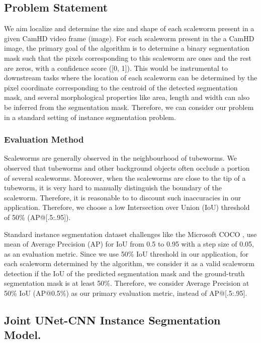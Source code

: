 \documentclass[10pt,twocolumn,letterpaper]{article}
\begin{document}
\subsection{Problem Statement}
We aim localize and determine the size and shape of each scaleworm present in a given CamHD video frame (image). For each scaleworm present in the a CamHD image, the primary goal of the algorithm is to determine a binary segmentation mask such that the pixels corresponding to this scaleworm are ones and the rest are zeros, with a confidence score ([0, 1]). This would be instrumental to downstream tasks where the location of each scaleworm can be determined by the pixel coordinate corresponding to the centroid of the detected segmentation mask, and several morphological properties like area, length and width can also be inferred from the segmentation mask. Therefore, we can consider our problem in a standard setting of instance segmentation problem.

\subsubsection{Evaluation Method}
Scaleworms are generally observed in the neighbourhood of tubeworms. We observed that tubeworms and other background objects often occlude a portion of several scaleworms. Moreover, when the scaleworms are close to the tip of a tubeworm, it is very hard to manually distinguish the boundary of the scaleworm. Therefore, it is reasonable to to discount such inaccuracies in our application. Therefore, we choose a low Intersection over Union (IoU) threshold of 50\% (AP@[.5:.95]).

Standard instance segmentation dataset challenges like the Microsoft COCO \cite{cocodata}, use mean of Average Precision (AP) \cite{averageprecision} for IoU from 0.5 to 0.95 with a step size of 0.05, as an evaluation metric. Since we use 50\% IoU threshold in our application, for each scaleworm determined by the algorithm, we consider it as a valid scaleworm detection if the IoU of the predicted segmentation mask and the ground-truth segmentation mask is at least 50\%. Therefore, we consider Average Precision at 50\% IoU (AP@0.5\%) as our primary evaluation metric, instead of AP@[.5:.95].

\subsection{Joint UNet-CNN Instance Segmentation Model.}
\end{document}

